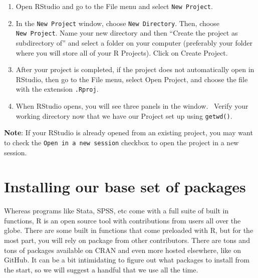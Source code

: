 \documentclass[
  letterpaper,
  DIV=11,
  numbers=noendperiod]{scrreprt}
\begin{document}
\begin{enumerate}
\def\labelenumi{\arabic{enumi}.}
\item
  Open RStudio and go to the File menu and select \texttt{New\ Project}.
\item
  In the \texttt{New\ Project} window, choose \texttt{New\ Directory}.
  Then, choose \texttt{New\ Project}. Name your new directory and then
  ``Create the project as subdirectory of'' and select a folder on your
  computer (preferably your folder where you will store all of your R
  Projects). Click on Create Project.
\item
  After your project is completed, if the project does not automatically
  open in RStudio, then go to the File menu, select Open Project, and
  choose the file with the extension \texttt{.Rproj}.
\item
  When RStudio opens, you will see three panels in the window.~ Verify
  your working directory now that we have our Project set up using
  \texttt{getwd()}.
\end{enumerate}

\textbf{Note}: If your RStudio is already opened from an existing
project, you may want to check the \texttt{Open\ in\ a\ new\ session}
checkbox to open the project in a new session.

\hypertarget{installing-our-base-set-of-packages}{%
\chapter{Installing our base set of
packages}\label{installing-our-base-set-of-packages}}

Whereas programs like Stata, SPSS, etc come with a full suite of built
in functions, R is an open source tool with contributions from users all
over the globe. There are some built in functions that come preloaded
with R, but for the most part, you will rely on package from other
contributors. There are tons and tons of packages available on CRAN and
even more hosted elsewhere, like on GitHub. It can be a bit intimidating
to figure out what packages to install from the start, so we will
suggest a handful that we use all the time.
\end{document}
